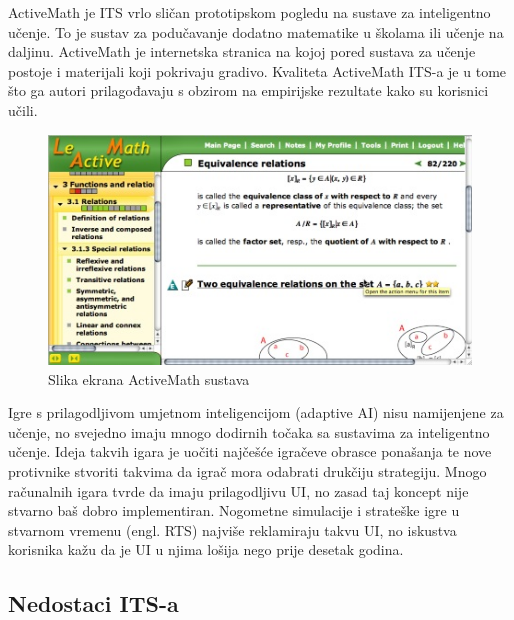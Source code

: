 \documentclass[times, utf8, zavrsni]{fer}
\begin{document}
\par
ActiveMath je ITS vrlo sličan prototipskom pogledu na sustave za inteligentno učenje. To je sustav za podučavanje dodatno matematike u školama ili učenje na daljinu. ActiveMath je internetska stranica na kojoj pored sustava za učenje postoje i materijali koji pokrivaju gradivo. Kvaliteta ActiveMath ITS-a je u tome što ga autori prilagođavaju s obzirom na empirijske rezultate kako su korisnici učili.

\begin{figure}[htb]
	\centering
	\includegraphics[]{img/activemath.jpg}
	\caption{Slika ekrana ActiveMath sustava}
	\label{fig:activemath}
\end{figure}


\par
Igre s prilagodljivom umjetnom inteligencijom (adaptive AI) nisu namijenjene za učenje, no svejedno imaju mnogo dodirnih točaka sa sustavima za inteligentno učenje. Ideja takvih igara je uočiti najčešće igračeve obrasce ponašanja te nove protivnike stvoriti takvima da igrač mora odabrati drukčiju strategiju. Mnogo računalnih igara tvrde da imaju prilagodljivu UI, no zasad taj koncept nije stvarno baš dobro implementiran. Nogometne simulacije i strateške igre u stvarnom vremenu (engl. RTS) najviše reklamiraju takvu UI, no iskustva korisnika kažu da je UI u njima lošija nego prije desetak godina.

\pagebreak

\subsection{Nedostaci ITS-a}
\end{document}
